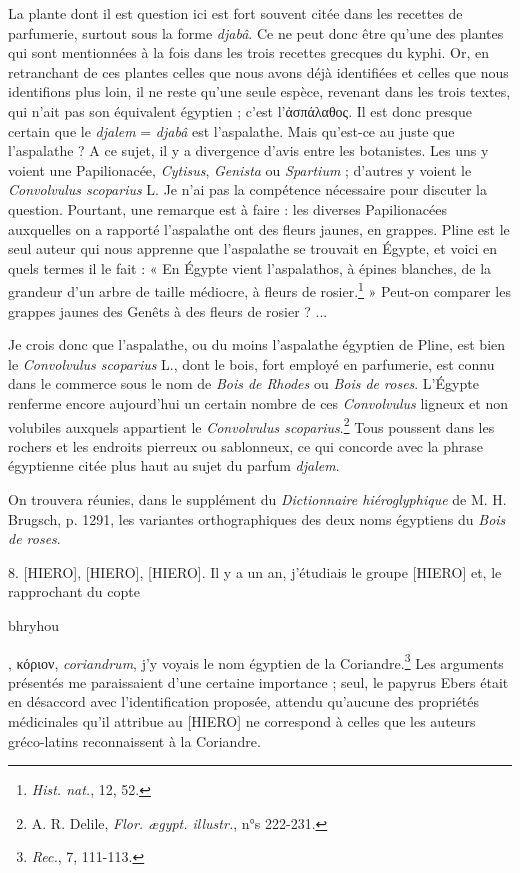 \documentclass[a4paper, 11pt, oneside]{article}
\begin{document}
La plante dont il est question ici est fort souvent citée dans les recettes de parfumerie, surtout sous la forme \emph{djabâ}. Ce ne peut donc être qu'une des plantes qui sont mentionnées à la fois dans les trois recettes grecques du kyphi. Or, en retranchant de ces plantes celles que nous avons déjà identifiées et celles que nous identifions plus loin, il ne reste qu'une seule espèce, revenant dans les trois textes, qui n'ait pas son équivalent égyptien ; c'est l'ἀσπάλαθος. Il est donc presque certain que le \emph{djalem} = \emph{djabâ} est l'aspalathe. Mais qu'est-ce au juste que l'aspalathe ? A ce sujet, il y a divergence d'avis entre les botanistes. Les uns y voient une Papilionacée, \emph{Cytisus}, \emph{Genista} ou \emph{Spartium} ; d'autres y voient le \emph{Convolvulus scoparius} L. Je n'ai pas la compétence nécessaire pour discuter la question. Pourtant, une remarque est à faire : les diverses Papilionacées auxquelles on a rapporté l'aspalathe ont des fleurs jaunes, en grappes. Pline est le seul auteur qui nous apprenne que l'aspalathe se trouvait en Égypte, et voici en quels termes il le fait : « En Égypte vient l'aspalathos, à épines blanches, de la grandeur d'un arbre de taille médiocre, à fleurs de rosier.\footnote{\emph{Hist. nat.}, 12, 52.} » Peut-on comparer les grappes jaunes des Genêts à des fleurs de rosier ? ...

Je crois donc que l'aspalathe, ou du moins l'aspalathe égyptien de Pline, est bien le \emph{Convolvulus scoparius} L., dont le bois, fort employé en parfumerie, est connu dans le commerce sous le nom de \emph{Bois de Rhodes} ou \emph{Bois de roses}. L'Égypte renferme encore aujourd'hui un certain nombre de ces \emph{Convolvulus} ligneux et non volubiles auxquels appartient le \emph{Convolvulus scoparius}.\footnote{A. R. Delile, \emph{Flor. ægypt. illustr.}, n°s 222-231.} Tous poussent dans les rochers et les endroits pierreux ou sablonneux, ce qui concorde avec la phrase égyptienne citée plus haut au sujet du parfum \emph{djalem}.

On trouvera réunies, dans le supplément du \emph{Dictionnaire hiéroglyphique} de M. H. Brugsch, p. 1291, les variantes orthographiques des deux noms égyptiens du \emph{Bois de roses}.

8. [HIERO], [HIERO], [HIERO]. Il y a un an, j'étudiais le groupe [HIERO] et, le rapprochant du copte \begin{coptic}bhryhou\end{coptic}, κόριον, \emph{coriandrum}, j'y voyais le nom égyptien de la Coriandre.\footnote{\emph{Rec.}, 7, 111-113.} Les arguments présentés me paraissaient d'une certaine importance ; seul, le papyrus Ebers était en désaccord avec l'identification proposée, attendu qu'aucune des propriétés médicinales qu'il attribue au [HIERO] ne correspond à celles que les auteurs gréco-latins reconnaissent à la Coriandre.
\end{document}
